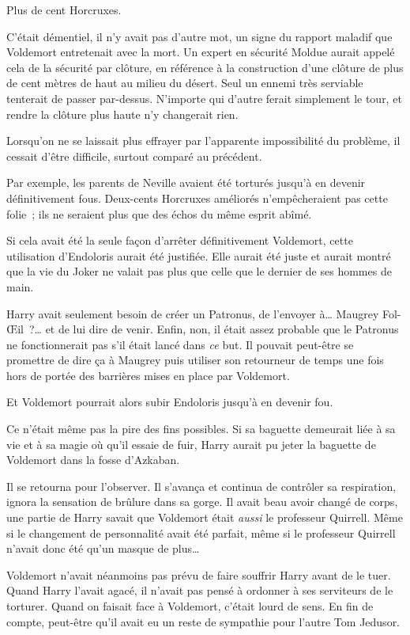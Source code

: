 Plus de cent Horcruxes.

C'était démentiel, il n'y avait pas d'autre mot, un signe du rapport maladif que Voldemort entretenait avec la mort.
Un expert en sécurité Moldue aurait appelé cela de la sécurité par clôture, en référence à la construction d'une clôture de plus de cent mètres de haut au milieu du désert.
Seul un ennemi très serviable tenterait de passer par-dessus.
N'importe qui d'autre ferait simplement le tour, et rendre la clôture plus haute n'y changerait rien.

Lorsqu'on ne se laissait plus effrayer par l'apparente impossibilité du problème, il cessait d'être difficile, surtout comparé au précédent.

Par exemple, les parents de Neville avaient été torturés jusqu'à en devenir définitivement fous.
Deux-cents Horcruxes améliorés n'empêcheraient pas cette folie~; ils ne seraient plus que des échos du même esprit abîmé.

Si cela avait été la seule façon d'arrêter définitivement Voldemort, cette utilisation d'Endoloris aurait été justifiée.
Elle aurait été juste et aurait montré que la vie du Joker ne valait pas plus que celle que le dernier de ses hommes de main.

Harry avait seulement besoin de créer un Patronus, de l'envoyer à…
Maugrey Fol-Œil~?… et de lui dire de venir.
Enfin, non, il était assez probable que le Patronus ne fonctionnerait pas s'il était lancé dans \emph{ce} but.
Il pouvait peut-être se promettre de dire ça à Maugrey puis utiliser son retourneur de temps une fois hors de portée des barrières mises en place par Voldemort.

Et Voldemort pourrait alors subir Endoloris jusqu'à en devenir fou.

Ce n'était même pas la pire des fins possibles.
Si sa baguette demeurait liée à sa vie et à sa magie où qu'il essaie de fuir, Harry aurait pu jeter la baguette de Voldemort dans la fosse d'Azkaban.

Il se retourna pour l'observer.
Il s'avança et continua de contrôler sa respiration, ignora la sensation de brûlure dans sa gorge.
Il avait beau avoir changé de corps, une partie de Harry savait que Voldemort était \emph{aussi} le professeur Quirrell.
Même si le changement de personnalité avait été parfait, même si le professeur Quirrell n'avait donc été qu'un masque de plus…

Voldemort n'avait néanmoins pas prévu de faire souffrir Harry avant de le tuer.
Quand Harry l'avait agacé, il n'avait pas pensé à ordonner à ses serviteurs de le torturer.
Quand on faisait face à Voldemort, c'était lourd de sens.
En fin de compte, peut-être qu'il avait eu un reste de sympathie pour l'autre Tom Jedusor.

